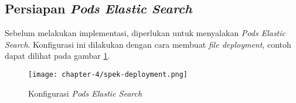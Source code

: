 \subsection{Persiapan \textit{Pods Elastic Search}}

Sebelum melakukan implementasi, diperlukan untuk menyalakan \textit{Pods Elastic Search}. Konfigurasi ini dilakukan dengan cara membuat \textit{file deployment}, contoh dapat dilihat pada gambar \ref{fig:spek-deployment}.

\begin{figure}[h]
    \centering
    \texttt{[image: chapter-4/spek-deployment.png]}
    \caption{Konfigurasi \textit{Pods Elastic Search}}
    \label{fig:spek-deployment}
\end{figure}







